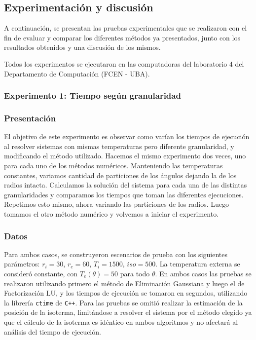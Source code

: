  \subsection{Experimentación y discusión}

    A continuación, se presentan las pruebas experimentales que se realizaron con el fin de evaluar y comparar los diferentes métodos ya presentados, junto con los resultados obtenidos y una discusión de los mismos.

    Todos los experimentos se ejecutaron en las computadoras del laboratorio 4 del Departamento de Computación (FCEN - UBA). 

    \subsubsection*{Experimento 1: Tiempo según granularidad} 

      \subsubsection*{Presentación}
        El objetivo de este experimento es observar como varían los tiempos de ejecución al resolver sistemas con mismas temperaturas pero diferente granularidad, y modificando el método utilizado. 
        Hacemos el mismo experimento dos veces, uno para cada uno de los métodos numéricos. Manteniendo las temperaturas constantes, variamos cantidad de particiones de los ángulos dejando la de los radios intacta. Calculamos la solución del sistema para cada una de las distintas granularidades y comparamos los tiempos que toman las diferentes ejecuciones. Repetimos esto mismo, ahora variando las particiones de los radios. Luego tomamos el otro método numérico y volvemos a iniciar el experimento. 

      \subsubsection*{Datos}
        Para ambos casos, se construyeron escenarios de prueba con los siguientes parámetros: $r_i = 30$, $r_e = 60$, $T_i = 1500$, $iso = 500$. La temperatura externa se consideró constante, con $T_e(\theta) = 50$ para todo $\theta$. En ambos casos las pruebas se realizaron utilizando primero el método de Eliminación Gaussiana y luego el de Factorización LU, y los tiempos de ejecución se tomaron en segundos, utilizando la librería \texttt{ctime} de \texttt{C++}. Para las pruebas se omitió realizar la estimación de la posición de la isoterma, limitándose a resolver el sistema por el método elegido ya que el cálculo de la isoterma es idéntico en ambos algoritmos y no afectará al análisis del tiempo de ejecución. 
      
